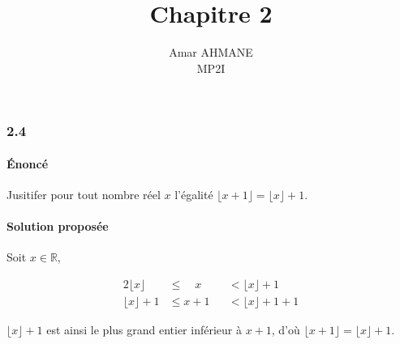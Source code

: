 \documentclass[10pt]{article}
\title{\huge\textbf{Chapitre 2}}
\author{Amar AHMANE\\ MP2I}
\date{}
\newcommand{\floor}[1]{\lfloor#1\rfloor}
\def\R{\mathbb R}
\begin{document}
    \maketitle
    \subsubsection*{2.4}
    \paragraph{Énoncé} Jusitifer pour tout nombre réel $x$ l'égalité $\floor{x+1}=\floor{x}+1$.
    

    \paragraph{Solution proposée} Soit $x\in\R$,

    \begin{alignat*}{2}
        \floor{x}&\leq \quad x  & &< \floor{x}+1\\
        \floor{x}+1&\leq x+1& &<\floor{x}+1+1
    \end{alignat*}

    $\floor{x}+1$ est ainsi le plus grand entier inférieur à $x+1$, d'où $\floor{x+1}=\floor{x}+1$.
    
    
\end{document}

